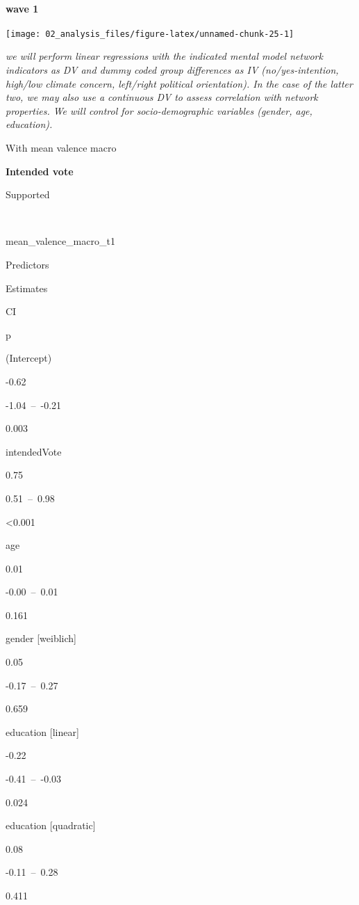 \documentclass[
]{article}
\begin{document}
\hypertarget{wave-1}{%
\paragraph{wave 1}\label{wave-1}}

\begin{center}\texttt{[image: 02\_analysis\_files/figure-latex/unnamed-chunk-25-1]} \end{center}

\emph{we will perform linear regressions with the indicated mental model
network indicators as DV and dummy coded group differences as IV
(no/yes-intention, high/low climate concern, left/right political
orientation). In the case of the latter two, we may also use a
continuous DV to assess correlation with network properties. We will
control for socio-demographic variables (gender, age, education).}

With mean valence macro

\textbf{Intended vote}

Supported

~

mean\_valence\_macro\_t1

Predictors

Estimates

CI

p

(Intercept)

-0.62

-1.04~--~-0.21

0.003

intendedVote

0.75

0.51~--~0.98

\textless0.001

age

0.01

-0.00~--~0.01

0.161

gender {[}weiblich{]}

0.05

-0.17~--~0.27

0.659

education {[}linear{]}

-0.22

-0.41~--~-0.03

0.024

education {[}quadratic{]}

0.08

-0.11~--~0.28

0.411
\end{document}

